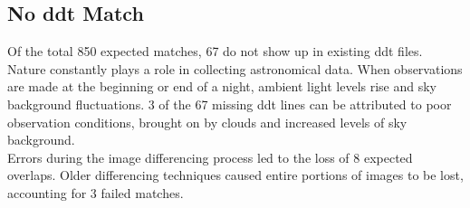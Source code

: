 \subsection{No ddt Match}\label{sec:noddtline}
%
%
\indent Of the total 850 expected matches, 67 do not show up in existing ddt files.  
%
Nature constantly plays a role in collecting astronomical data. When 
observations are made at the beginning or end of a night, ambient light 
levels rise and sky background fluctuations. 3 of the 67 missing ddt 
lines can be attributed to poor observation conditions, brought on by 
clouds and increased levels of sky background.\\
%
%
\indent Errors during the image differencing process led to the loss of 8 
expected overlaps. Older differencing techniques caused entire portions 
of images to be lost, accounting for 3 failed matches.\\
%
\iffalse
